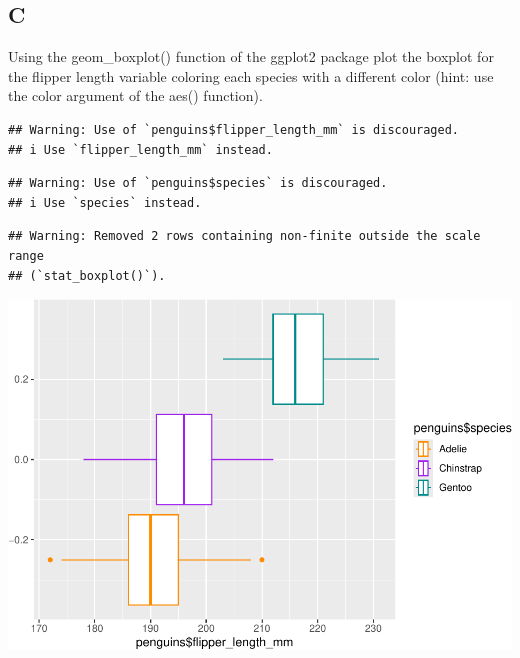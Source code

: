 \documentclass[
]{article}
\newenvironment{Shaded}{\begin{snugshade}}{\end{snugshade}}
\newcommand{\DataTypeTok}[1]{\textcolor[rgb]{0.13,0.29,0.53}{#1}}
\newcommand{\KeywordTok}[1]{\textcolor[rgb]{0.13,0.29,0.53}{\textbf{#1}}}
\newcommand{\NormalTok}[1]{#1}
\newcommand{\OperatorTok}[1]{\textcolor[rgb]{0.81,0.36,0.00}{\textbf{#1}}}
\newcommand{\StringTok}[1]{\textcolor[rgb]{0.31,0.60,0.02}{#1}}
\begin{document}
\hypertarget{c-2}{%
\subsection{C}\label{c-2}}

Using the geom\_boxplot() function of the ggplot2 package plot the
boxplot for the flipper length variable coloring each species with a
different color (hint: use the color argument of the aes() function).

\begin{Shaded}
\end{Shaded}

\begin{verbatim}
## Warning: Use of `penguins$flipper_length_mm` is discouraged.
## i Use `flipper_length_mm` instead.
\end{verbatim}

\begin{verbatim}
## Warning: Use of `penguins$species` is discouraged.
## i Use `species` instead.
\end{verbatim}

\begin{verbatim}
## Warning: Removed 2 rows containing non-finite outside the scale range
## (`stat_boxplot()`).
\end{verbatim}

\includegraphics{es_files/figure-latex/unnamed-chunk-11-1.pdf}
\end{document}
